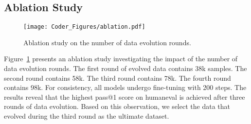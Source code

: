 \documentclass{article}
\begin{document}
\subsection{Ablation Study}



\begin{figure}
\centering
     \texttt{[image: Coder\_Figures/ablation.pdf]}
     \caption{Ablation study on the number of data evolution rounds.}
     \label{fig:ablation}
\end{figure} 
Figure~\ref{fig:ablation} presents an ablation study investigating the impact of the number of data evolution rounds. The first round of evolved data contains 38k samples. The second round contains 58k. The third round contains 78k. The fourth round contains 98k. For consistency, all models undergo fine-tuning with 200 steps. The results reveal that the highest pass@1 score on humaneval is achieved after three rounds of data evolution. Based on this observation, we select the data that evolved during the third round as the ultimate dataset.
\end{document}
